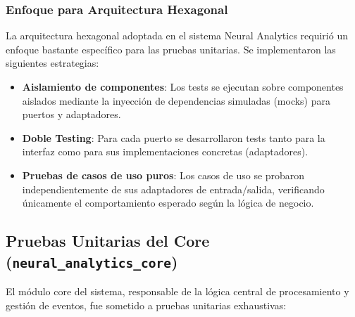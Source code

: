 \subsubsection{Enfoque para Arquitectura Hexagonal}

La arquitectura hexagonal adoptada en el sistema Neural Analytics requirió un enfoque bastante específico para las pruebas unitarias. Se implementaron las siguientes estrategias:

\begin{itemize}
    \item \textbf{Aislamiento de componentes}: Los tests se ejecutan sobre componentes aislados mediante la inyección de dependencias simuladas (mocks) para puertos y adaptadores.
    
    \item \textbf{Doble Testing}: Para cada puerto se desarrollaron tests tanto para la interfaz como para sus implementaciones concretas (adaptadores).
    
    \item \textbf{Pruebas de casos de uso puros}: Los casos de uso se probaron independientemente de sus adaptadores de entrada/salida, verificando únicamente el comportamiento esperado según la lógica de negocio.
\end{itemize}

\newpage
\subsection{Pruebas Unitarias del Core (\texttt{neural\_analytics\_core})}

El módulo core del sistema, responsable de la lógica central de procesamiento y gestión de eventos, fue sometido a pruebas unitarias exhaustivas:


